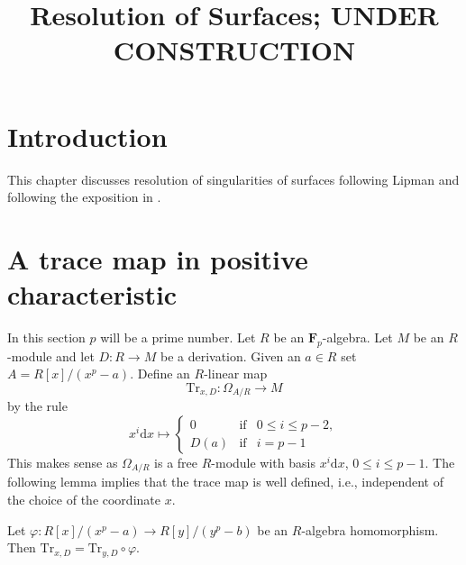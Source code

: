 

%


\title{Resolution of Surfaces; UNDER CONSTRUCTION}


\maketitle

\label{section-phantom}

\tableofcontents

\section{Introduction}
\label{section-introduction}

\noindent
This chapter discusses resolution of singularities of surfaces
following Lipman \cite{Lipman} and following the exposition
in \cite{Artin-Lipman}.





\section{A trace map in positive characteristic}
\label{section-trace}

\noindent
In this section $p$ will be a prime number. Let $R$ be an
$\mathbf{F}_p$-algebra. Let $M$ be an $R$-module and let $D : R \to M$ be a
derivation. Given an $a \in R$ set $A = R[x]/(x^p - a)$.
Define an $R$-linear map
$$
\text{Tr}_{x, D} : \Omega_{A/R} \longrightarrow M
$$
by the rule
$$
x^i\text{d}x \longmapsto
\left\{
\begin{matrix}
0 & \text{if} & 0 \leq i \leq p - 2, \\
D(a) & \text{if} & i = p - 1
\end{matrix}
\right.
$$
This makes sense as $\Omega_{A/R}$ is a free $R$-module with
basis $x^i\text{d}x$, $0 \leq i \leq p - 1$.
The following lemma implies that the trace map is well defined,
i.e., independent of the choice of the coordinate $x$.

\begin{lemma}
\label{lemma-trace-well-defined}
Let $\varphi : R[x]/(x^p - a) \to R[y]/(y^p - b)$ be an $R$-algebra
homomorphism. Then
$\text{Tr}_{x, D} = \text{Tr}_{y, D} \circ \varphi$.
\end{lemma}

